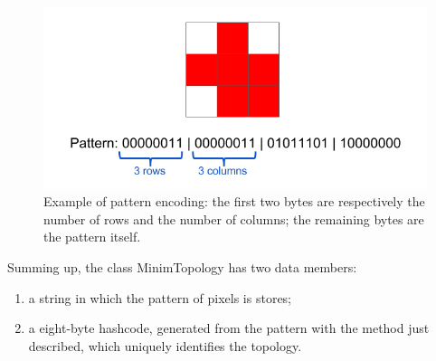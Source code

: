 \begin{figure}
  \centering
  \includegraphics[scale=0.5]{figures/pattern.png}
  \caption{Example of pattern encoding: the first two bytes are respectively the number of rows and the number of columns; the remaining bytes are the pattern itself.}
  \label{fig:pattern}
\end{figure}
%
Summing up, the class MinimTopology has two data members:
\begin{enumerate}
 \item a string in which the pattern of pixels is stores;
 \item a eight-byte hashcode, generated from the pattern with the method just described, which uniquely identifies the topology.
\end{enumerate}
%
